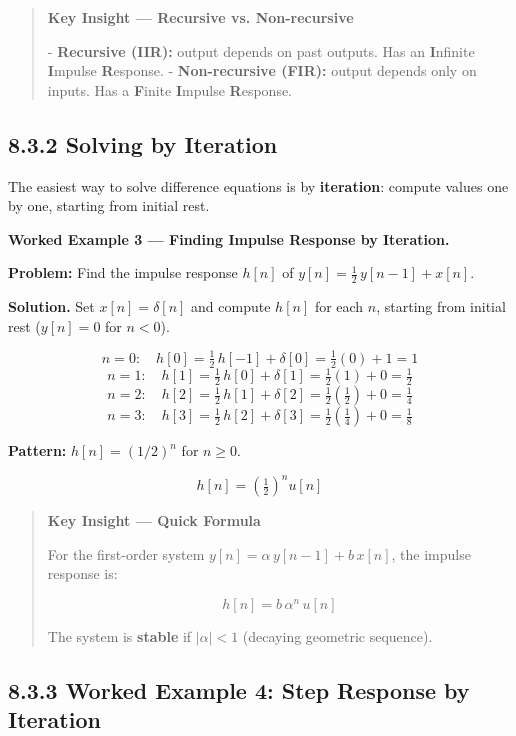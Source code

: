 \documentclass[11pt]{article}
\begin{document}
\begin{quote}
\textbf{Key Insight — Recursive vs. Non-recursive}

- \textbf{Recursive (IIR):} output depends on past outputs. Has an \textbf{I}nfinite \textbf{I}mpulse \textbf{R}esponse.
- \textbf{Non-recursive (FIR):} output depends only on inputs. Has a \textbf{F}inite \textbf{I}mpulse \textbf{R}esponse.
\end{quote}

\subsection*{8.3.2 Solving by Iteration}

The easiest way to solve difference equations is by \textbf{iteration}: compute values one by one, starting from initial rest.

\textbf{Worked Example 3 — Finding Impulse Response by Iteration.}

\textbf{Problem:} Find the impulse response $h[n]$ of $y[n] = \tfrac{1}{2}\,y[n-1] + x[n]$.

\textbf{Solution.} Set $x[n] = \delta[n]$ and compute $h[n]$ for each $n$, starting from initial rest ($y[n] = 0$ for $n < 0$).

\[n = 0:\quad h[0] = \tfrac{1}{2}\,h[-1] + \delta[0] = \tfrac{1}{2}(0) + 1 = 1\]
\[n = 1:\quad h[1] = \tfrac{1}{2}\,h[0] + \delta[1] = \tfrac{1}{2}(1) + 0 = \tfrac{1}{2}\]
\[n = 2:\quad h[2] = \tfrac{1}{2}\,h[1] + \delta[2] = \tfrac{1}{2}\!\left(\tfrac{1}{2}\right) + 0 = \tfrac{1}{4}\]
\[n = 3:\quad h[3] = \tfrac{1}{2}\,h[2] + \delta[3] = \tfrac{1}{2}\!\left(\tfrac{1}{4}\right) + 0 = \tfrac{1}{8}\]

\textbf{Pattern:} $h[n] = (1/2)^n$ for $n \geq 0$.

\[\boxed{\;h[n] = \left(\tfrac{1}{2}\right)^n u[n]\;}\]

\begin{quote}
\textbf{Key Insight — Quick Formula}

For the first-order system $y[n] = \alpha\,y[n-1] + b\,x[n]$, the impulse response is:

\[h[n] = b\,\alpha^n\,u[n]\]

The system is \textbf{stable} if $|\alpha| < 1$ (decaying geometric sequence).
\end{quote}

\subsection*{8.3.3 Worked Example 4: Step Response by Iteration}
\end{document}
